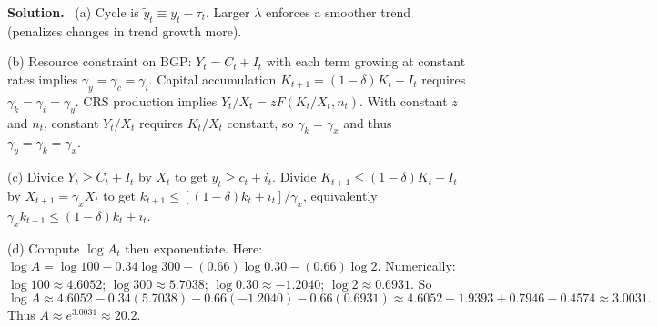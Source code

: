 \documentclass[12pt]{article}
\newenvironment{sol}{\par\smallskip\noindent\textbf{Solution.}\ }{\par\medskip}
\begin{document}
\begin{sol}
(a) Cycle is \(\tilde y_t\equiv y_t-\tau_t\). Larger \(\lambda\) enforces a smoother trend (penalizes changes in trend growth more).

(b) Resource constraint on BGP: \(Y_t=C_t+I_t\) with each term growing at constant rates implies \(\gamma_y=\gamma_c=\gamma_i\).
Capital accumulation \(K_{t+1}=(1-\delta)K_t+I_t\) requires \(\gamma_k=\gamma_i=\gamma_y\).
CRS production implies \(Y_t/X_t=zF(K_t/X_t,n_t)\). With constant \(z\) and \(n_t\), constant \(Y_t/X_t\) requires \(K_t/X_t\) constant,
so \(\gamma_k=\gamma_x\) and thus \(\gamma_y=\gamma_k=\gamma_x\).

(c) Divide \(Y_t\ge C_t+I_t\) by \(X_t\) to get \(y_t\ge c_t+i_t\).
Divide \(K_{t+1}\le (1-\delta)K_t+I_t\) by \(X_{t+1}=\gamma_x X_t\) to get
\(k_{t+1}\le [(1-\delta)k_t+i_t]/\gamma_x\), equivalently \(\gamma_x k_{t+1}\le (1-\delta)k_t+i_t\).

(d) Compute \(\log A_t\) then exponentiate.
Here: \(\log A = \log 100 -0.34\log 300 -(0.66)\log 0.30 -(0.66)\log 2\).
Numerically: \(\log 100\approx 4.6052\); \(\log 300\approx 5.7038\); \(\log 0.30\approx -1.2040\); \(\log 2\approx 0.6931\).
So
\[
\log A \approx 4.6052 -0.34(5.7038) -0.66(-1.2040) -0.66(0.6931)
\approx 4.6052 -1.9393 +0.7946 -0.4574 \approx 3.0031.
\]
Thus \(A\approx e^{3.0031}\approx 20.2\).
\end{sol}
\end{document}
